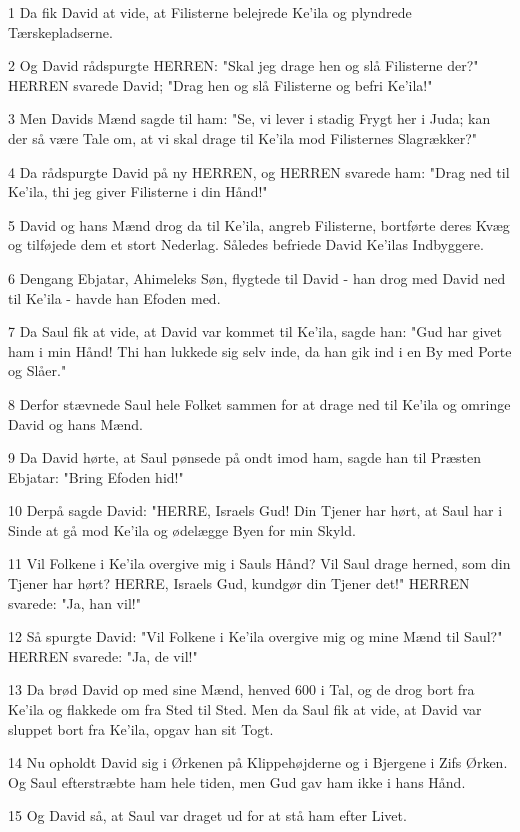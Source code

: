 \par 1 Da fik David at vide, at Filisterne belejrede Ke'ila og plyndrede Tærskepladserne.
\par 2 Og David rådspurgte HERREN: "Skal jeg drage hen og slå Filisterne der?" HERREN svarede David; "Drag hen og slå Filisterne og befri Ke'ila!"
\par 3 Men Davids Mænd sagde til ham: "Se, vi lever i stadig Frygt her i Juda; kan der så være Tale om, at vi skal drage til Ke'ila mod Filisternes Slagrækker?"
\par 4 Da rådspurgte David på ny HERREN, og HERREN svarede ham: "Drag ned til Ke'ila, thi jeg giver Filisterne i din Hånd!"
\par 5 David og hans Mænd drog da til Ke'ila, angreb Filisterne, bortførte deres Kvæg og tilføjede dem et stort Nederlag. Således befriede David Ke'ilas Indbyggere.
\par 6 Dengang Ebjatar, Ahimeleks Søn, flygtede til David - han drog med David ned til Ke'ila - havde han Efoden med.
\par 7 Da Saul fik at vide, at David var kommet til Ke'ila, sagde han: "Gud har givet ham i min Hånd! Thi han lukkede sig selv inde, da han gik ind i en By med Porte og Slåer."
\par 8 Derfor stævnede Saul hele Folket sammen for at drage ned til Ke'ila og omringe David og hans Mænd.
\par 9 Da David hørte, at Saul pønsede på ondt imod ham, sagde han til Præsten Ebjatar: "Bring Efoden hid!"
\par 10 Derpå sagde David: "HERRE, Israels Gud! Din Tjener har hørt, at Saul har i Sinde at gå mod Ke'ila og ødelægge Byen for min Skyld.
\par 11 Vil Folkene i Ke'ila overgive mig i Sauls Hånd? Vil Saul drage herned, som din Tjener har hørt? HERRE, Israels Gud, kundgør din Tjener det!" HERREN svarede: "Ja, han vil!"
\par 12 Så spurgte David: "Vil Folkene i Ke'ila overgive mig og mine Mænd til Saul?" HERREN svarede: "Ja, de vil!"
\par 13 Da brød David op med sine Mænd, henved 600 i Tal, og de drog bort fra Ke'ila og flakkede om fra Sted til Sted. Men da Saul fik at vide, at David var sluppet bort fra Ke'ila, opgav han sit Togt.
\par 14 Nu opholdt David sig i Ørkenen på Klippehøjderne og i Bjergene i Zifs Ørken. Og Saul efterstræbte ham hele tiden, men Gud gav ham ikke i hans Hånd.
\par 15 Og David så, at Saul var draget ud for at stå ham efter Livet.
